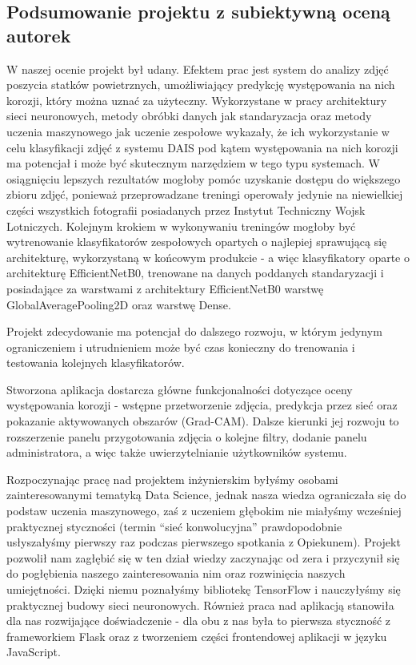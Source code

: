 \documentclass[polish,12pt]{aghthesis}
\begin{document}
\subsection{Podsumowanie projektu z subiektywną oceną autorek}

W naszej ocenie projekt był udany. Efektem prac jest system do analizy zdjęć poszycia statków powietrznych, umożliwiający predykcję występowania na nich korozji, który można uznać za użyteczny. Wykorzystane w pracy architektury sieci neuronowych, metody obróbki danych jak standaryzacja oraz metody uczenia maszynowego jak uczenie zespołowe wykazały, że ich wykorzystanie w celu klasyfikacji zdjęć z systemu DAIS pod kątem występowania na nich korozji ma potencjał i może być skutecznym narzędziem w tego typu systemach. W osiągnięciu lepszych rezultatów mogłoby pomóc uzyskanie dostępu do większego zbioru zdjęć, ponieważ przeprowadzane treningi operowały jedynie na niewielkiej części wszystkich fotografii posiadanych przez Instytut Techniczny Wojsk Lotniczych. Kolejnym krokiem w wykonywaniu treningów mogłoby być wytrenowanie klasyfikatorów zespołowych opartych o najlepiej sprawującą się architekturę, wykorzystaną w końcowym produkcie - a więc klasyfikatory oparte o architekturę EfficientNetB0, trenowane na danych poddanych standaryzacji i posiadające za warstwami z architektury EfficientNetB0 warstwę GlobalAveragePooling2D oraz warstwę Dense. 

Projekt zdecydowanie ma potencjał do dalszego rozwoju, w którym jedynym ograniczeniem i utrudnieniem może być czas konieczny do trenowania i testowania kolejnych klasyfikatorów.

Stworzona aplikacja dostarcza główne funkcjonalności dotyczące oceny występowania korozji - wstępne przetworzenie zdjęcia, predykcja przez sieć oraz pokazanie aktywowanych obszarów (Grad-CAM). Dalsze kierunki jej rozwoju to rozszerzenie panelu przygotowania zdjęcia o kolejne filtry, dodanie panelu administratora, a więc także uwierzytelnianie użytkowników systemu.

Rozpoczynając pracę nad projektem inżynierskim byłyśmy osobami zainteresowanymi tematyką Data Science, jednak nasza wiedza ograniczała się do podstaw uczenia maszynowego, zaś z uczeniem głębokim nie miałyśmy wcześniej praktycznej styczności (termin ``sieć konwolucyjna'' prawdopodobnie usłyszałyśmy pierwszy raz podczas pierwszego spotkania z Opiekunem). Projekt pozwolił nam zagłębić się w ten dział wiedzy zaczynając od zera i przyczynił się do pogłębienia naszego zainteresowania nim oraz rozwinięcia naszych umiejętności. Dzięki niemu poznałyśmy bibliotekę TensorFlow i nauczyłyśmy się praktycznej budowy sieci neuronowych. Również praca nad aplikacją stanowiła dla nas rozwijające doświadczenie - dla obu z nas była to pierwsza styczność z frameworkiem Flask oraz z tworzeniem części frontendowej aplikacji w języku JavaScript.
\end{document}
